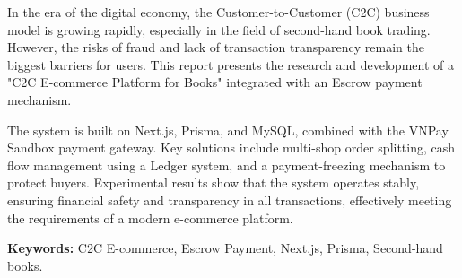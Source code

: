 \documentclass[../main.tex]{subfiles}
\begin{document}
In the era of the digital economy, the Customer-to-Customer (C2C) business model is growing rapidly, especially in the field of second-hand book trading. However, the risks of fraud and lack of transaction transparency remain the biggest barriers for users. This report presents the research and development of a "C2C E-commerce Platform for Books" integrated with an Escrow payment mechanism.

The system is built on Next.js, Prisma, and MySQL, combined with the VNPay Sandbox payment gateway. Key solutions include multi-shop order splitting, cash flow management using a Ledger system, and a payment-freezing mechanism to protect buyers. Experimental results show that the system operates stably, ensuring financial safety and transparency in all transactions, effectively meeting the requirements of a modern e-commerce platform.

\textbf{Keywords:} C2C E-commerce, Escrow Payment, Next.js, Prisma, Second-hand books.
\end{document}
